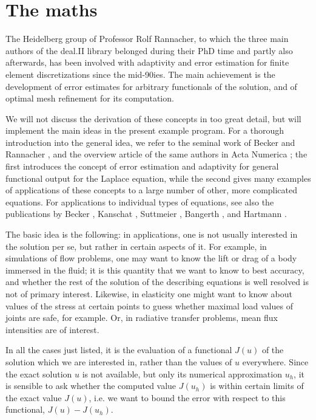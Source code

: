 \documentclass{article}
\begin{document}
\section{The maths}

The Heidelberg group of Professor Rolf Rannacher, to which the three main
authors of the deal.II library belonged during their PhD time and partly also
afterwards, has been involved with adaptivity and error estimation for finite
element discretizations since the mid-90ies. The main achievement is the
development of error estimates for arbitrary functionals of the solution, and
of optimal mesh refinement for its computation.

We will not discuss the derivation of these concepts in too great detail, but
will implement the main ideas in the present example program. For a thorough
introduction into the general idea, we refer to the seminal work of Becker and
Rannacher \cite{BR95,BR96r}, and the overview article of the same authors in
Acta Numerica \cite{BR01}; the first introduces the concept of error
estimation and adaptivity for general functional output for the Laplace
equation, while the second gives many examples of applications of these
concepts to a large number of other, more complicated equations. For
applications to individual types of equations, see also the publications by
Becker \cite{Bec95,Bec98}, Kanschat \cite{Kan96,FK97}, Suttmeier
\cite{Sut96,RS97,RS98c,RS99}, Bangerth \cite{BR99b,Ban00w,BR01a,Ban02}, and
Hartmann \cite{HH01,HH01a,HH01b}.

The basic idea is the following: in applications, one is not usually
interested in the solution per se, but rather in certain aspects of it. For
example, in simulations of flow problems, one may want to know the lift or
drag of a body immersed in the fluid; it is this quantity that we want to know
to best accuracy, and whether the rest of the solution of the describing
equations is well resolved is not of primary interest. Likewise, in elasticity
one might want to know about values of the stress at certain points to guess
whether maximal load values of joints are safe, for example. Or, in radiative
transfer problems, mean flux intensities are of interest.

In all the cases just listed, it is the evaluation of a functional $J(u)$ of
the solution which we are interested in, rather than the values of $u$
everywhere. Since the exact solution $u$ is not available, but only its
numerical approximation $u_h$, it is sensible to ask whether the computed
value $J(u_h)$ is within certain limits of the exact value $J(u)$, i.e. we
want to bound the error with respect to this functional, $J(u)-J(u_h)$.
\end{document}
